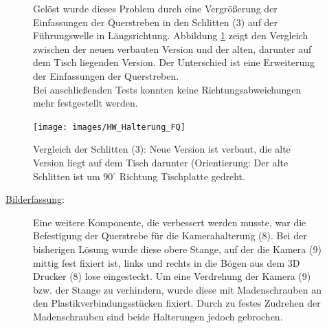 \begin{figure} [h]

\begin{minipage}[t]{0.45\textwidth}
\vspace{0pt}
Gelöst wurde dieses Problem durch eine Vergrößerung der Einfassungen der Querstreben in den Schlitten (3) auf der Führungswelle in Längsrichtung. Abbildung \ref{HW_HVQuer} zeigt den Vergleich zwischen der neuen verbauten Version und der alten, darunter auf dem Tisch liegenden Version. Der Unterschied ist eine Erweiterung der Einfassungen der Querstreben.\\
Bei anschließenden Tests konnten keine Richtungsabweichungen mehr festgestellt werden.
\end{minipage}
\hspace{0.1\textwidth}
\begin{minipage}[t]{0.4\textwidth}
\vspace{0pt}
\texttt{[image: images/HW\_Halterung\_FQ]}
 \caption{Vergleich der Schlitten (3): Neue Version ist verbaut, die alte Version liegt auf dem Tisch darunter (Orientierung: Der alte Schlitten ist um $90^\circ$  Richtung Tischplatte gedreht. }
\label{HW_HVQuer}
\end{minipage}
\end{figure}
\clearpage 




\underline{Bilderfassung}:
\begin{figure} [h]

\begin{minipage}[t]{\textwidth}
\vspace{0pt}
    Eine weitere Komponente, die verbessert werden musste, war die Befestigung der Querstrebe für die Kamerahalterung (8). Bei der bisherigen Lösung wurde diese obere Stange, auf der die Kamera (9) mittig fest fixiert ist, links und rechts in die Bögen aus dem 3D Drucker (8) lose eingesteckt. Um eine Verdrehung der Kamera (9) bzw. der Stange zu verhindern, wurde diese mit Madenschrauben an den Plastikverbindungsstücken fixiert. Durch zu festes Zudrehen der Madenschrauben sind beide Halterungen jedoch gebrochen.\\
\end{minipage}
\end{figure}

